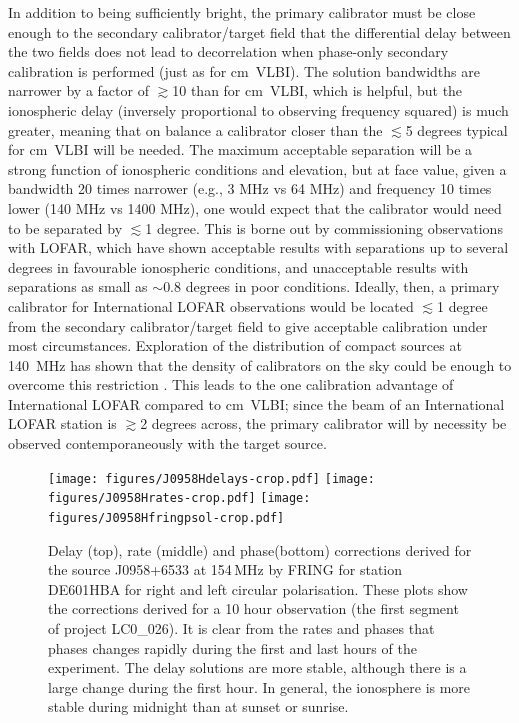 \documentclass[graybox]{svmult}
\begin{document}
In addition to being sufficiently bright, the primary calibrator must be close
enough to the secondary calibrator/target field that the differential delay
between the two fields does not lead to decorrelation when phase-only secondary
calibration is performed (just as for cm~VLBI).  The solution bandwidths are
narrower by a factor of $\gtrsim$10 than for cm~VLBI, which is helpful, but the
ionospheric delay (inversely proportional to observing frequency squared) is
much greater, meaning that on balance a calibrator closer than the $\lesssim$5
degrees typical for cm~VLBI will be needed.  The maximum acceptable separation
will be a strong function of ionospheric conditions and elevation, but at face
value, given a bandwidth 20 times narrower (e.g., 3 MHz vs 64 MHz) and
frequency 10 times lower (140 MHz vs 1400 MHz), one would expect that the
calibrator would need to be separated by $\lesssim$1 degree.  This is borne out
by commissioning observations with LOFAR, which have shown acceptable results
with separations up to several degrees in favourable ionospheric conditions,
and unacceptable results with separations as small as $\sim$0.8 degrees in poor
conditions.  Ideally, then, a primary calibrator for International LOFAR
observations would be located $\lesssim$1 degree from the secondary
calibrator/target field to give acceptable calibration under most
circumstances. Exploration of the distribution of compact sources at 140~MHz
has shown that the density of calibrators on the sky could be enough to
overcome this restriction \citep{moldon15}. This leads to the one calibration
advantage of International LOFAR compared to cm~VLBI; since the beam of an
International LOFAR station is $\gtrsim$2 degrees across, the primary
calibrator will by necessity be observed contemporaneously with the target
source.


\begin{figure}[htbp]
\begin{center}
\texttt{[image: figures/J0958Hdelays-crop.pdf]}
\texttt{[image: figures/J0958Hrates-crop.pdf]}
\texttt{[image: figures/J0958Hfringpsol-crop.pdf]}
\caption{
Delay (top), rate (middle) and phase(bottom) corrections derived for the source
J0958+6533 at 154\,MHz by FRING for station DE601HBA for right and left
circular polarisation. These plots show the corrections derived for a 10 hour
observation (the first segment of project LC0\_026). It is clear from the rates
and phases that phases changes rapidly during the first and last hours of the
experiment. The delay solutions are more stable, although there is a large
change during the first hour. In general, the ionosphere is more stable during
midnight than at sunset or sunrise.  }

\end{center}
\end{figure}
\end{document}
